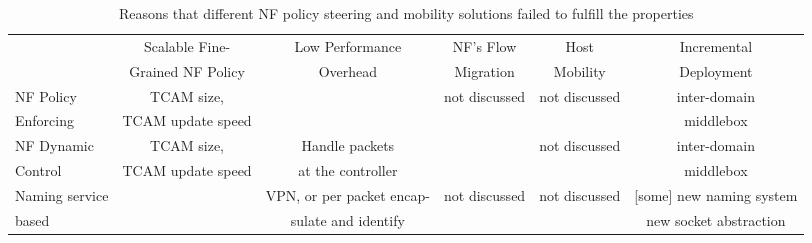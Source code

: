 


\begin{table*}[ht]\label{compare} 
\centering
\small 

\begin{tabular} {| l |c | c| c| c| c |} \hline


                            			     &Scalable Fine-              &   Low Performance    &  NF's  Flow      &  Host        &  Incremental \\
						     &Grained NF Policy    	  &   Overhead           & Migration       &  Mobility   & Deployment \\\hline
						     
NF Policy                                           & TCAM size,      	          &                      & not discussed      &   not discussed  & inter-domain  \\
Enforcing~\cite{SIMPLE,FLOWTAGS}                   & TCAM update speed          &                      &                   &               &  middlebox \\ \hline


NF Dynamic                                          &TCAM size,     	          &  Handle packets      &                &  not discussed    & inter-domain\\ 
Control~\cite{OpenNF,splitmerge}                       &  TCAM update speed         & at the controller     &                &                & middlebox  \\   \hline


Naming service                          &			  	 & VPN, or per packet encap-                   & not discussed       & not discussed &  [some] new naming system  \\ 
based~\cite{DOA, Aplomb}                         &                              & sulate and identify          &                    &                  & new socket abstraction     \\\hline 



\end{tabular}
\caption{\small Reasons that different NF policy steering and mobility solutions failed to fulfill the properties}
\end{table*}





